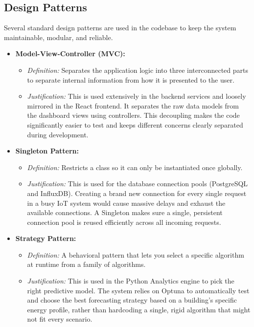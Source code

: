 \documentclass[12pt, a4paper]{article}
\begin{document}
\subsection{Design Patterns}
Several standard design patterns are used in the codebase to keep the system maintainable, modular, and reliable.
\begin{itemize}
    \item \textbf{Model-View-Controller (MVC):}
    \begin{itemize}
        \item \textit{Definition:} Separates the application logic into three interconnected parts to separate internal information from how it is presented to the user.
        \item \textit{Justification:} This is used extensively in the backend services and loosely mirrored in the React frontend. It separates the raw data models from the dashboard views using controllers. This decoupling makes the code significantly easier to test and keeps different concerns clearly separated during development.
    \end{itemize}
    \item \textbf{Singleton Pattern:}
    \begin{itemize}
        \item \textit{Definition:} Restricts a class so it can only be instantiated once globally.
        \item \textit{Justification:} This is used for the database connection pools (PostgreSQL and InfluxDB). Creating a brand new connection for every single request in a busy IoT system would cause massive delays and exhaust the available connections. A Singleton makes sure a single, persistent connection pool is reused efficiently across all incoming requests.
    \end{itemize}
    \item \textbf{Strategy Pattern:}
    \begin{itemize}
        \item \textit{Definition:} A behavioral pattern that lets you select a specific algorithm at runtime from a family of algorithms.
        \item \textit{Justification:} This is used in the Python Analytics engine to pick the right predictive model. The system relies on Optuna to automatically test and choose the best forecasting strategy based on a building's specific energy profile, rather than hardcoding a single, rigid algorithm that might not fit every scenario.
    \end{itemize}
\end{itemize}
\end{document}
